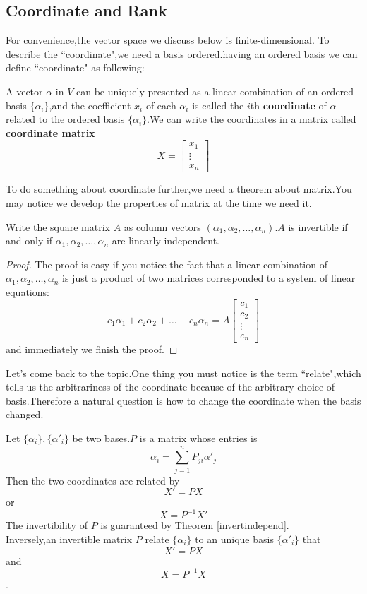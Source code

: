 \documentclass{article}
\begin{document}
\subsection{Coordinate and Rank}
\noindent For convenience,the vector space we discuss below is finite-dimensional.
\indent To describe the ``coordinate",we need a basis ordered.having an ordered basis we can define ``coordinate" as following:
\begin{dde}
	A vector $\alpha$ in $V$ can be uniquely presented as a linear combination of an ordered basis $\{\alpha_i\}$,and the coefficient $x_i$ of each $\alpha_i$ is called the $i$th \textbf{coordinate} of $\alpha$ related to the ordered basis $\{\alpha_i\}$.We can write the coordinates in a matrix called \textbf{coordinate matrix}
	\[X=\begin{bmatrix}
		x_1\\
		\vdots\\
		x_n
	\end{bmatrix}\]   
\end{dde}
To do something about coordinate further,we need a theorem about matrix.You may notice we develop the properties of matrix at the time we need it.
\begin{thm}\label{invertindepend}
	Write the square matrix $A$ as column vectors $(\alpha_1,\alpha_2,\dots,\alpha_n)$.$A$ is invertible if and only if $\alpha_1,\alpha_2,\dots,\alpha_n$ are linearly independent. 
\end{thm}
\begin{proof}
	The proof is easy if you notice the fact that a linear combination of $\alpha_1,\alpha_2,\dots,\alpha_n$ is just a product of two matrices corresponded to a system of linear equations:
	\[c_1\alpha_1+c_2\alpha_2+\dots+c_n\alpha_n=A\begin{bmatrix}
		c_1\\
		c_2\\
		\vdots\\
		c_n
	\end{bmatrix}\]
	and immediately we finish the proof.
\end{proof}
Let's come back to the topic.One thing you must notice is the term ``relate",which tells us the arbitrariness of the coordinate because of the arbitrary choice of basis.Therefore a natural question is how to change the coordinate when the basis changed.
\begin{thm}
	Let $\{\alpha_i\},\{\alpha'_i\}$ be two bases.$P$ is a matrix whose entries is
	\[\alpha_i=\sum\limits_{j=1}^nP_{ji}\alpha'_j\]Then the two coordinates are related by
	\[X'=PX\]or\[X=P^{-1}X'\]The invertibility of $P$ is guaranteed by Theorem \ref{invertindepend}.\\
	Inversely,an invertible matrix $P$ relate $\{\alpha_i\}$ to an unique basis $\{\alpha'_i\}$ that 
	\[X'=PX\]and\[X=P^{-1}X\].
\end{thm}
\end{document}
